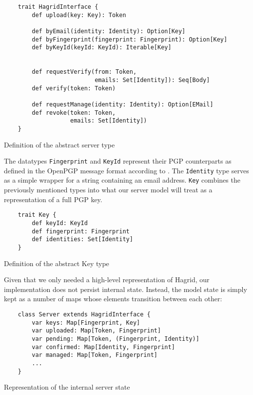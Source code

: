 \begin{code}
    \begin{verbatim}
    trait HagridInterface {
        def upload(key: Key): Token

        def byEmail(identity: Identity): Option[Key]
        def byFingerprint(fingerprint: Fingerprint): Option[Key]
        def byKeyId(keyId: KeyId): Iterable[Key]

        
        def requestVerify(from: Token, 
                          emails: Set[Identity]): Seq[Body]
        def verify(token: Token)

        def requestManage(identity: Identity): Option[EMail]
        def revoke(token: Token, 
                   emails: Set[Identity])
    }
    \end{verbatim}
        \caption{Definition of the abstract server type}
        \label{def:HagridInterface}
\end{code}

The datatypes \texttt{Fingerprint} and \texttt{KeyId} represent their PGP counterparts as defined in the OpenPGP message format according to \cite{callas1998openpgp}. The \texttt{Identity} type serves as a simple wrapper for a string containing an email address. \texttt{Key} combines the previously mentioned types into what our server model will treat as a representation of a full PGP key.
\begin{code}
    \begin{verbatim}
    trait Key {
        def keyId: KeyId
        def fingerprint: Fingerprint
        def identities: Set[Identity]
    }
    \end{verbatim}
\caption{Definition of the abstract Key type}
\end{code}

Given that we only needed a high-level representation of Hagrid, our implementation does not persist internal state. Instead, the model state is simply kept as a number of maps whose elements transition between each other: 
\begin{code}
    \begin{verbatim}
    class Server extends HagridInterface {
        var keys: Map[Fingerprint, Key]
        var uploaded: Map[Token, Fingerprint]
        var pending: Map[Token, (Fingerprint, Identity)]
        var confirmed: Map[Identity, Fingerprint]
        var managed: Map[Token, Fingerprint]
        ...
    }
    \end{verbatim} 
    \caption{Representation of the internal server state}
\end{code}


